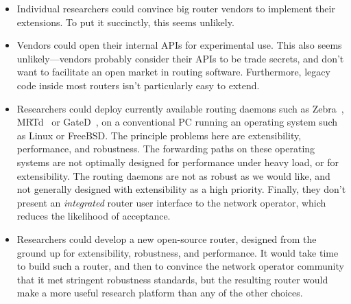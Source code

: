 \begin{itemize}

\item Individual researchers could convince big router vendors to implement
their extensions. To put it succinctly, this seems unlikely.

\item Vendors could open their internal APIs for experimental use. This
also seems unlikely---vendors probably consider their APIs to be trade
secrets, and don't want to facilitate an open market in routing software.
Furthermore, legacy code inside most routers isn't particularly easy
to extend.


\item Researchers could deploy currently available routing daemons
such as Zebra~\cite{zebra}, MRTd~\cite{mrt} or GateD~\cite{gated}, on a conventional PC running an operating
system such as Linux or FreeBSD.  The principle problems here are
extensibility, performance, and robustness.  The forwarding paths on
these operating systems are not optimally designed for performance
under heavy load, or for extensibility.  The routing daemons are not as
robust as we would like, and not generally designed with extensibility
as a high priority.  Finally, they don't present an {\it integrated}
router user interface to the network operator, which reduces the
likelihood of acceptance.

\item Researchers could develop a new open-source router, designed from the
ground up for extensibility, robustness, and performance.
It would take time to build such a router, and then to convince the network
operator community that it met stringent robustness standards, but
the resulting router would make a more useful research platform than any of
the other choices.

\end{itemize}

